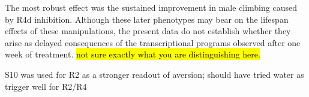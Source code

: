 The most robust effect was the sustained improvement in male climbing caused by R4d inhibition. 
Although these later phenotypes may bear on the lifespan effects of these manipulations, the present data do not establish whether they arise as delayed consequences of the transcriptional programs observed after one week of treatment.
\hl{not sure exactly what you are distinguishing here.}



S10 was used for R2 as a stronger readout of aversion; should have tried water as trigger well for R2/R4



